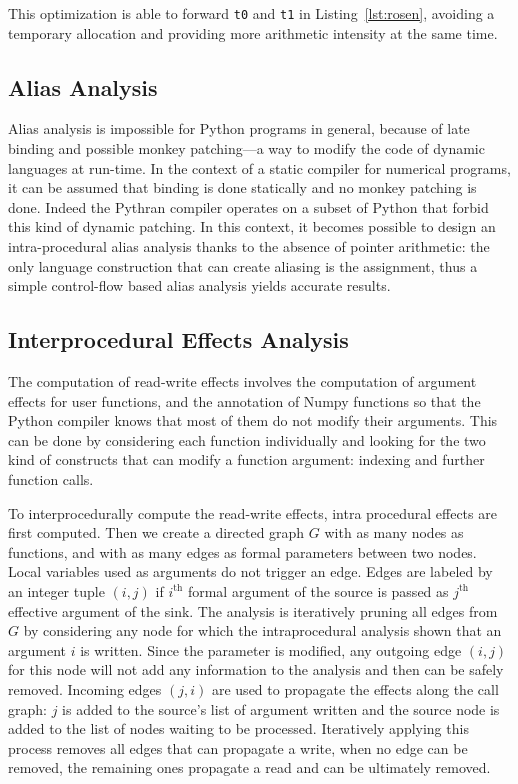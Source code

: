 \documentclass[10pt, preprint]{sigplanconf}
\begin{document}
This optimization is able to forward \texttt{t0} and \texttt{t1} in 
Listing~\ref{lst:rosen}, avoiding a temporary allocation and providing more
arithmetic intensity at the same time.


\subsection{Alias Analysis}
\label{sec:alias}

Alias analysis is impossible for Python programs in general, because of late
binding and possible monkey patching---a way to modify the code of dynamic
languages at run-time. In the context of a static compiler for
numerical programs, it can be assumed that binding is done statically and no
monkey patching is done. Indeed the Pythran compiler operates on a subset of 
Python that forbid this kind of dynamic patching. 
In this context, it becomes possible to design an intra-procedural alias 
analysis thanks to the absence of pointer arithmetic:
the only language construction that can create aliasing is the assignment, thus
a simple control-flow based alias analysis yields accurate results.

\subsection{Interprocedural Effects Analysis}
\label{sec:effects}

The computation of read-write effects involves the computation of argument 
effects for user functions, and the annotation of Numpy functions
so that the Python compiler knows that most of them do not modify their
arguments. This can be done by considering each function individually and 
looking for the two kind of constructs that can modify a function argument: 
indexing and further function calls.

To interprocedurally compute the read-write effects, intra procedural effects
are first computed. Then we create a directed graph $G$ with as many nodes as
functions, and with as many edges as formal parameters between two nodes. Local
variables used as arguments do not trigger an edge.
Edges are labeled by an integer tuple $(i, j)$ if $i^\text{th}$ formal
argument of the source is passed as $j^\text{th}$ effective argument of the
sink. The analysis is iteratively pruning all edges from $G$ by considering any
node for which the intraprocedural analysis shown that an argument $i$ is 
written. Since the parameter is modified, any outgoing edge $(i, j)$ for this 
node will not add any information to the analysis and then can be safely 
removed. Incoming edges $(j, i)$ are used to propagate the effects along the 
call graph: $j$ is added to the source's list of argument written and the source
node is added to the list of nodes waiting to be processed. Iteratively
applying this process removes all edges that can propagate a write, when no edge
can be removed, the remaining ones propagate a read and can be ultimately 
removed.
\end{document}

